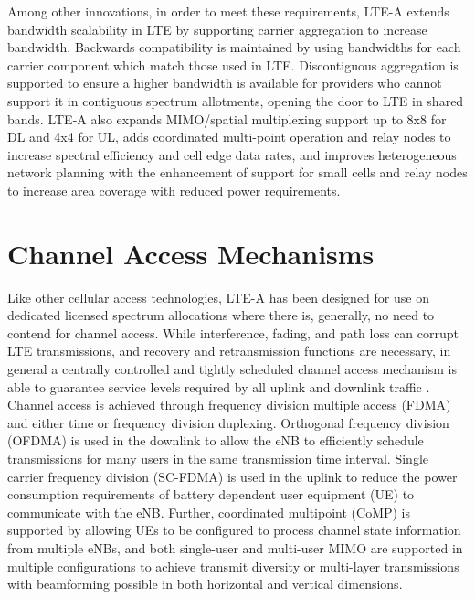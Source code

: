 Among other innovations, in order to meet these requirements, LTE-A extends bandwidth scalability in LTE by supporting carrier aggregation to increase bandwidth. Backwards compatibility is maintained by using bandwidths for each carrier component which match those used in LTE.  Discontiguous aggregation is supported to ensure a higher bandwidth is available for providers who cannot support it in contiguous spectrum allotments, opening the door to LTE in shared bands.  LTE-A also expands MIMO/spatial multiplexing support up to 8x8 for DL and 4x4 for UL, adds coordinated multi-point operation and relay nodes to increase spectral efficiency and cell edge data rates, and improves heterogeneous network planning with the enhancement of support for small cells and relay nodes to increase area coverage with reduced power requirements.

\section{Channel Access Mechanisms}
\label{channel-access}
Like other cellular access technologies, LTE-A has been designed for use on dedicated licensed spectrum allocations where there is, generally, no need to contend for channel access.  While interference, fading, and path loss can corrupt LTE transmissions, and recovery and retransmission functions are necessary, in general a centrally controlled and tightly scheduled channel access mechanism is able to guarantee service levels required by all uplink and downlink traffic \cite{tr36300}.  Channel access is achieved through frequency division multiple access (FDMA) and either time or frequency division duplexing.  Orthogonal frequency division (OFDMA) is used in the downlink to allow the eNB to efficiently schedule transmissions for many users in the same transmission time interval.  Single carrier frequency division (SC-FDMA) is used in the uplink to reduce the power consumption requirements of battery dependent user equipment (UE) to communicate with the eNB.  Further, coordinated multipoint (CoMP) is supported by allowing UEs to be configured to process channel state information from multiple eNBs, and both single-user and multi-user MIMO are supported in multiple configurations to achieve transmit diversity or multi-layer transmissions with beamforming possible in both horizontal and vertical dimensions.

